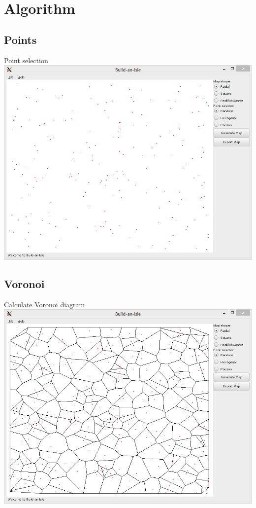\documentclass[english,aspectratio=43]{beamer}
\begin{document}
	\section{Algorithm}
	\subsection{Points}
	\begin{frame}{Point selection}
		\centering
		\includegraphics[width=0.7\linewidth]{points}
	\end{frame}

	\subsection{Voronoi}
	\begin{frame}{Calculate Voronoi diagram}
		\centering
		\includegraphics[width=0.7\linewidth]{voronoi}
	\end{frame}
\end{document}
